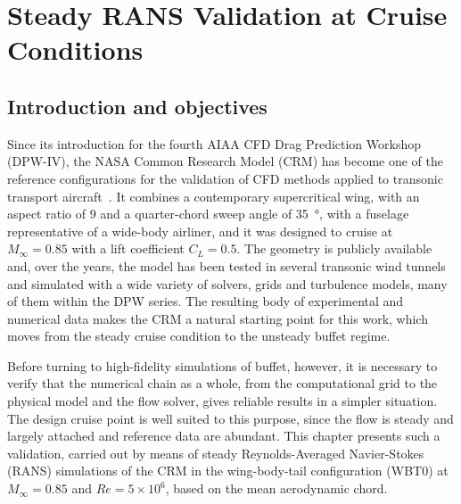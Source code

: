 \chapter{Steady RANS Validation at Cruise Conditions}
\label{ch:rans_validation}


\section{Introduction and objectives}
\label{sec:val_intro}

Since its introduction for the fourth AIAA CFD Drag Prediction Workshop (DPW-IV), the NASA Common Research Model (CRM) has become one of the reference configurations for the validation of CFD methods applied to transonic transport aircraft~\cite{vassberg2008}. It combines a contemporary supercritical wing, with an aspect ratio of 9 and a quarter-chord sweep angle of \SI{35}{\degree}, with a fuselage representative of a wide-body airliner, and it was designed to cruise at $M_\infty = 0.85$ with a lift coefficient $C_L = 0.5$. The geometry is publicly available and, over the years, the model has been tested in several transonic wind tunnels and simulated with a wide variety of solvers, grids and turbulence models, many of them within the DPW series. The resulting body of experimental and numerical data makes the CRM a natural starting point for this work, which moves from the steady cruise condition to the unsteady buffet regime.

Before turning to high-fidelity simulations of buffet, however, it is necessary to verify that the numerical chain as a whole, from the computational grid to the physical model and the flow solver, gives reliable results in a simpler situation. The design cruise point is well suited to this purpose, since the flow is steady and largely attached and reference data are abundant. This chapter presents such a validation, carried out by means of steady Reynolds-Averaged Navier-Stokes (RANS) simulations of the CRM in the wing-body-tail configuration (WBT0) at $M_\infty = 0.85$ and $Re = 5\times10^{6}$, based on the mean aerodynamic chord.

